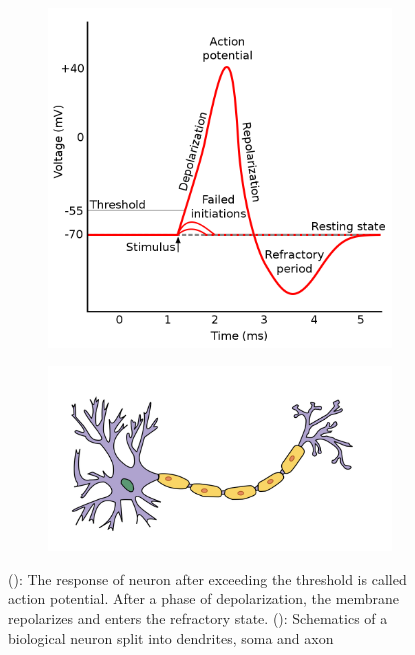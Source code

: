 \begin{figure}
	\begin{subfigure}{0.5\textwidth}
		\centering
		\caption{}
		\includegraphics[width=0.8\linewidth, valign=t]{figures/action_potential.png}
		\label{actionpotential}
	\end{subfigure}
	\begin{subfigure}{0.5\textwidth}
		\centering
		\caption{}
		\vspace{0.5cm}
		\includegraphics[width=\linewidth, valign=t]{figures/neuron_model.png}
		\vspace{1.5cm}	
		\label{biosynapse}
	\end{subfigure}
	\caption{(): The response of neuron after exceeding the threshold is called action potential. After a phase of depolarization, the membrane repolarizes and enters the refractory state. (): Schematics of a biological neuron split into dendrites, soma and axon}
	\label{biologicalneuron}

\end{figure}

